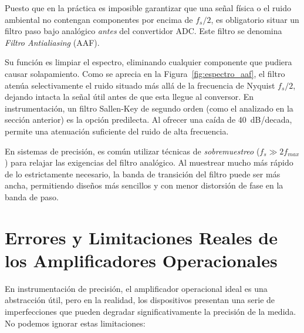 Puesto que en la práctica es imposible garantizar que una señal física o el ruido ambiental no contengan componentes por encima de $f_s/2$, es obligatorio situar un filtro paso bajo analógico \emph{antes} del convertidor ADC. Este filtro se denomina \textit{Filtro Antialiasing} (AAF).

Su función es limpiar el espectro, eliminando cualquier componente que pudiera causar solapamiento. Como se aprecia en la Figura~\ref{fig:espectro_aaf}, el filtro atenúa selectivamente el ruido situado más allá de la frecuencia de Nyquist $f_s/2$, dejando intacta la señal útil antes de que esta llegue al conversor. En instrumentación, un filtro Sallen-Key de segundo orden (como el analizado en la sección anterior) es la opción predilecta. Al ofrecer una caída de \qty{40}{dB/decada}, permite una atenuación suficiente del ruido de alta frecuencia.

En sistemas de precisión, es común utilizar técnicas de \emph{sobremuestreo} ($f_s \gg 2 f_{max}$) para relajar las exigencias del filtro analógico. Al muestrear mucho más rápido de lo estrictamente necesario, la banda de transición del filtro puede ser más ancha, permitiendo diseños más sencillos y con menor distorsión de fase en la banda de paso.






\section{Errores y Limitaciones Reales de los Amplificadores Operacionales}\label{sec:errores_opamp}

En instrumentación de precisión, el amplificador operacional ideal es una abstracción útil, pero en la realidad, los dispositivos presentan una serie de imperfecciones que pueden degradar significativamente la precisión de la medida. No podemos ignorar estas limitaciones:


